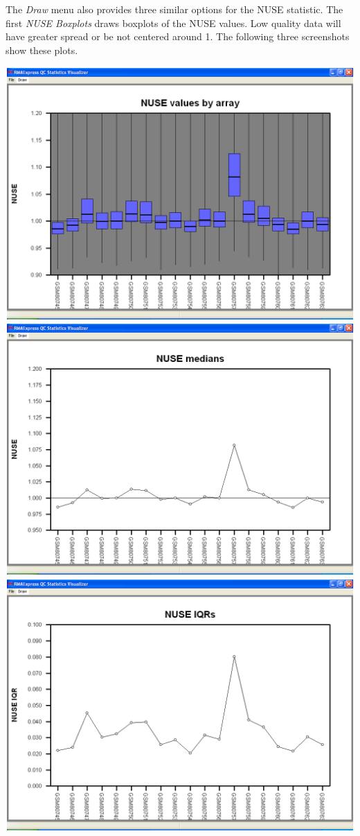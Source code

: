 \documentclass[11pt]{report}
\begin{document}
The {\it Draw} menu also provides three similar options for the NUSE statistic. The first {\it NUSE Boxplots} draws boxplots of the NUSE values. Low quality data will have greater spread or be not centered around 1. The following three screenshots show these plots.
\begin{center}
\includegraphics[scale=0.4]{NUSEBoxplot.png}\\
\includegraphics[scale=0.4]{NUSEMedians.png}\\
\includegraphics[scale=0.4]{NUSEIQRs.png}\\
\end{center}
\end{document}
